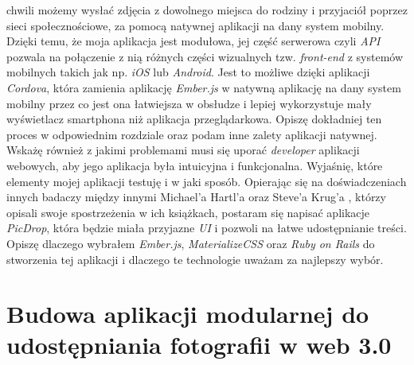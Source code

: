 \documentclass[openright]{xmgr}
\begin{document}
chwili możemy wysłać zdjęcia z dowolnego miejsca do rodziny i przyjaciół poprzez sieci społecznościowe, za pomocą natywnej aplikacji na dany system mobilny. Dzięki temu, że moja aplikacja jest modułowa, jej część serwerowa czyli \textit{API} pozwala na połączenie z nią różnych części wizualnych tzw. \textit{front-end} z systemów mobilnych takich jak np. \textit{iOS} lub \textit{Android}. Jest to możliwe dzięki aplikacji \textit{Cordova}, która zamienia aplikację \textit{Ember.js} w natywną aplikację na dany system mobilny przez co jest ona łatwiejsza w obsłudze i lepiej wykorzystuje mały wyświetlacz smartphona niż aplikacja przeglądarkowa. Opiszę dokładniej ten proces w odpowiednim rozdziale oraz podam inne zalety aplikacji natywnej. Wskażę również z jakimi problemami musi się uporać \textit{developer} aplikacji webowych, aby jego aplikacja była intuicyjna i funkcjonalna. Wyjaśnię, które elementy mojej aplikacji testuję i w jaki sposób. Opierając się na  doświadczeniach innych badaczy  między innymi Michael'a Hartl'a \cite{RailsTutorialBook} oraz Steve'a Krug'a  \cite {StiveKrug}, którzy opisali swoje spostrzeżenia w ich książkach, postaram się napisać aplikacje \textit{PicDrop}, która  będzie miała przyjazne \textit{UI} i pozwoli na łatwe udostępnianie treści. Opiszę dlaczego wybrałem \textit{Ember.js}, \textit{MaterializeCSS} oraz \textit{Ruby on Rails} do stworzenia tej aplikacji i dlaczego te technologie uważam za najlepszy wybór.


\chapter{Budowa aplikacji modularnej do udostępniania fotografii  w web 3.0}
\end{document}
